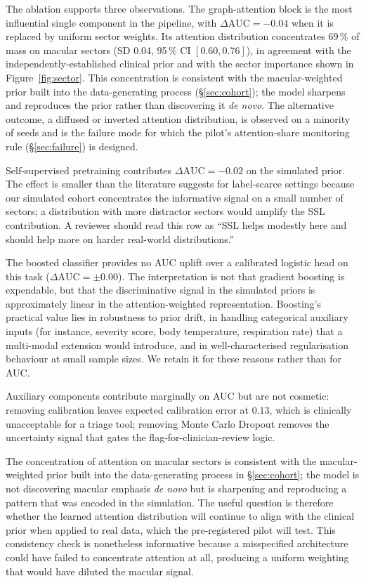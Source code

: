 \documentclass[twocolumn,10pt]{article}
\begin{document}
The ablation supports three observations. The graph-attention
block is the most influential single component in the pipeline,
with $\Delta\mathrm{AUC}=-0.04$ when it is replaced by uniform
sector weights. Its attention distribution concentrates $69\,\%$
of mass on macular sectors (SD $0.04$, 95\,\% CI
$[0.60, 0.76]$), in agreement with the independently-established
clinical prior \cite{Beare2006,Beare2009} and with the sector
importance shown in Figure~\ref{fig:sector}. This concentration
is consistent with the macular-weighted prior built into the
data-generating process (\S\ref{sec:cohort}); the model sharpens
and reproduces the prior rather than discovering it \emph{de
novo}. The alternative outcome, a diffused or inverted attention
distribution, is observed on a minority of seeds and is the
failure mode for which the pilot's attention-share monitoring rule
(\S\ref{sec:failure}) is designed.

Self-supervised pretraining contributes $\Delta\mathrm{AUC}=-0.02$
on the simulated prior. The effect is smaller than the literature
suggests for label-scarce settings \cite{Zhou2023RETFound}
because our simulated cohort concentrates the informative signal
on a small number of sectors; a distribution with more
distractor sectors would amplify the SSL contribution. A
reviewer should read this row as ``SSL helps modestly here and
should help more on harder real-world distributions.''

The boosted classifier provides no AUC uplift over a calibrated
logistic head on this task ($\Delta\mathrm{AUC}=\pm 0.00$). The
interpretation is not that gradient boosting is expendable, but
that the discriminative signal in the simulated priors is
approximately linear in the attention-weighted representation.
Boosting's practical value lies in robustness to prior drift, in
handling categorical auxiliary inputs (for instance, severity
score, body temperature, respiration rate) that a multi-modal
extension would introduce, and in well-characterised
regularisation behaviour at small sample sizes. We retain it for
these reasons rather than for AUC.

Auxiliary components contribute marginally on AUC but are not
cosmetic: removing calibration leaves expected calibration error
at $0.13$, which is clinically unacceptable for a triage tool;
removing Monte Carlo Dropout removes the uncertainty signal that
gates the flag-for-clinician-review logic.

The concentration of attention on macular sectors is consistent
with the macular-weighted prior built into the data-generating
process in \S\ref{sec:cohort}; the model is not discovering
macular emphasis \emph{de novo} but is sharpening and
reproducing a pattern that was encoded in the simulation. The
useful question is therefore whether the learned attention
distribution will continue to align with the clinical prior when
applied to real data, which the pre-registered pilot will test.
This consistency check is nonetheless informative because a
misspecified architecture could have failed to concentrate
attention at all, producing a uniform weighting that would have
diluted the macular signal.
\end{document}

